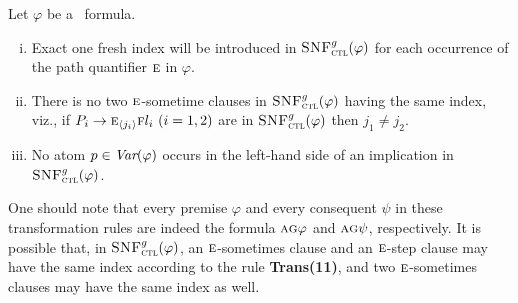 \documentclass[twoside,11pt]{article}
\begin{document}
\begin{lemma}
  Let $\varphi$ be a \CTL\ formula.
  \begin{enumerate}[(i)]
   \item Exact one fresh index will be introduced in ${\textsc{SNF}_{\textsc{ctl}}^g}(\varphi)$ for each occurrence of the path quantifier $\textsc{e}$ in $\varphi$.
   \item There is no two $\textsc{e}$-sometime clauses in ${\textsc{SNF}_{\textsc{ctl}}^g}(\varphi)$ having the same index, viz.,
  if $P_i\rightarrow \textsc{e}_{{\langle{j_i}\rangle}}\textsc{f} l_i~(i=1,2)$ are in ${\textsc{SNF}_{\textsc{ctl}}^g}(\varphi)$ then
  $j_1\neq j_2$.
  	\item No atom $p \in\textit{Var}(\varphi)$ occurs in the left-hand side of an implication in ${\textsc{SNF}_{\textsc{ctl}}^g}(\varphi)$.
  \end{enumerate}
\end{lemma}

One should note that every premise $\varphi$ and every consequent $\psi$ in these transformation rules are indeed
the formula $\textsc{a}\textsc{g}\varphi$ and $\textsc{a}\textsc{g}\psi$, respectively.
It is possible that, in ${\textsc{SNF}_{\textsc{ctl}}^g}(\varphi)$, an $\textsc{e}$-sometimes clause and an $\textsc{e}$-step clause
may have the same index  according to the rule \textbf{Trans(11)}, and two $\textsc{e}$-sometimes clauses may have the same index as well.

\end{document}
